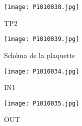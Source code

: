 

\begin{figure}[ht!]
    \centering
    \texttt{[image: P1010038.jpg]}
    \caption{TP2}
    \label{TP2}
\end{figure}

\begin{figure}[ht!]
    \centering
    \texttt{[image: P1010039.jpg]}
    \caption{Schéma de la plaquette}
    \label{plaquette}
\end{figure}

\begin{figure}[ht!]
    \centering
    \texttt{[image: P1010034.jpg]}
    \caption{IN1}
    \label{IN1}
\end{figure}

\begin{figure}[ht!]
    \centering
    \texttt{[image: P1010035.jpg]}
    \caption{OUT}
    \label{OUT}
\end{figure}


